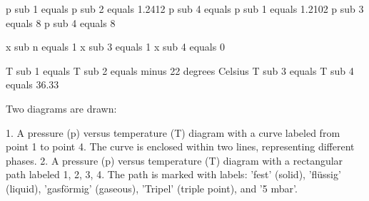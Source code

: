 p sub 1 equals p sub 2 equals 1.2412  
p sub 4 equals p sub 1 equals 1.2102  
p sub 3 equals 8  
p sub 4 equals 8  

x sub n equals 1  
x sub 3 equals 1  
x sub 4 equals 0  

T sub 1 equals  
T sub 2 equals minus 22 degrees Celsius  
T sub 3 equals  
T sub 4 equals 36.33  

Two diagrams are drawn:

1. A pressure (p) versus temperature (T) diagram with a curve labeled from point 1 to point 4. The curve is enclosed within two lines, representing different phases.
2. A pressure (p) versus temperature (T) diagram with a rectangular path labeled 1, 2, 3, 4. The path is marked with labels: 'fest' (solid), 'flüssig' (liquid), 'gasförmig' (gaseous), 'Tripel' (triple point), and '5 mbar'.